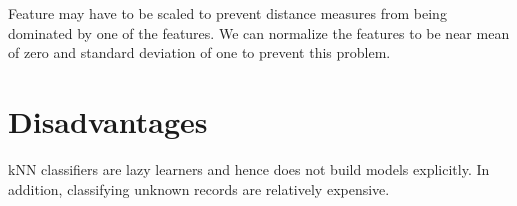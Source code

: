 \begin{multicols*}{2}
\noindent Feature may have to be scaled to prevent distance measures from being dominated by one of the features. We can normalize the features to be near mean of zero and standard deviation of one to prevent this problem. 

\section{Disadvantages}

kNN classifiers are lazy learners and hence does not build models explicitly. In addition, classifying unknown records are relatively expensive. 


\end{multicols*}